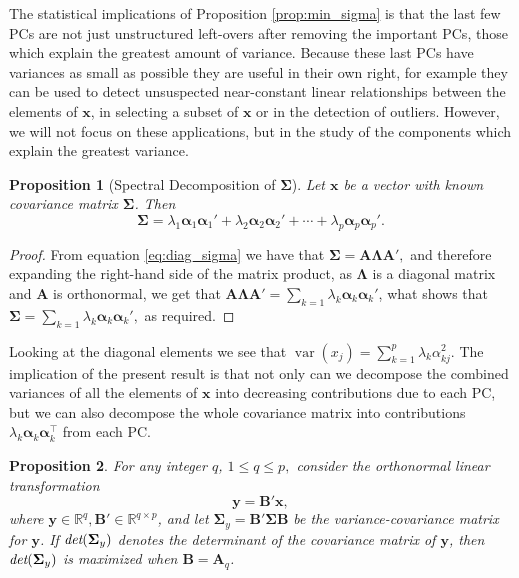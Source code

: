 \documentclass[11pt, oneside]{book}
\theoremstyle{plain}
\newtheorem{prop}{Proposition}[section]
\theoremstyle{remark}
\DeclareMathOperator{\var}{var}
\begin{document}
The statistical implications of Proposition \ref{prop:min_sigma} is that the
last few PCs are not just unstructured left-overs after removing the important
PCs, those which explain the greatest amount of variance. Because these last PCs
have variances as small as possible they are useful in their own right, for
example they can be used to detect unsuspected near-constant linear
relationships between the elements of $\mathbf{x}$, in selecting a subset of
$\mathbf{x}$ or in the detection of outliers. However, we will not focus on
these applications, but in the study of the components which explain the
greatest variance.
\begin{prop}[Spectral Decomposition of $\mathbf{\Sigma}$]\label{prop:specdecomp} 
    Let $\mathbf{x}$ be a vector with known covariance matrix $\mathbf{\Sigma}$.
    Then $$\mathbf{\Sigma} = \lambda_1\bm{\alpha}_1\bm{\alpha}_1' + 
    \lambda_2\bm{\alpha}_2\bm{\alpha}_2' + \cdots +
    \lambda_p\bm{\alpha}_p\bm{\alpha}_p'.$$
\end{prop}    
\begin{proof}
    From equation \eqref{eq:diag_sigma} we have that $\mathbf{\Sigma} =
    \mathbf{A\Lambda A'},$ and therefore expanding the right-hand side of the
    matrix product, as $\mathbf{\Lambda}$ is a diagonal matrix and $\mathbf{A}$
    is orthonormal, we get that $\mathbf{A\Lambda A'} = \sum_{k=1}
    \lambda_k\bm{\alpha}_k\bm{\alpha}_k'$, what shows that $\mathbf{\Sigma} =
    \sum_{k=1} \lambda_k\bm{\alpha}_k\bm{\alpha}_k',$ as required.
\end{proof}    
Looking at the diagonal elements we see that $\var(x_j) =
\sum_{k=1}^p\lambda_k\alpha^2_{kj}$. The implication of the present result is
that not only can we decompose the combined variances of all the elements of
$\mathbf{x}$ into decreasing contributions due to each PC, but we can also
decompose the whole covariance matrix into contributions
$\lambda_k\bm{\alpha}_k\bm{\alpha}_k^\top$ from each PC.
\begin{prop}\label{prop:max_det}
    For any integer $q$, $1\leq q\leq p,$ consider the orthonormal linear
    transformation $$\mathbf{y} = \mathbf{B'x},$$ where
    $\mathbf{y}\in\mathbb{R}^q, \mathbf{B'}\in\mathbb{R}^{q\times p}$, and let
    $\mathbf{\Sigma}_y = \mathbf{B'\Sigma B}$ be the variance-covariance matrix
    for $\mathbf{y}$. If $\emph{det}(\mathbf{\Sigma}_y)$ denotes the determinant
    of the covariance matrix of $\mathbf{y}$, then
    $\emph{det}(\mathbf{\Sigma}_y)$ is maximized when $\mathbf{B} =
    \mathbf{A}_q$.
\end{prop}    
\end{document}
